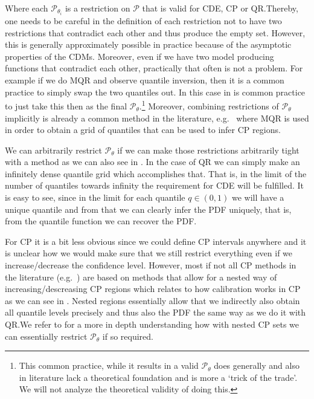 Where each $\mathscr{P}_{\theta_i}$ is a restriction on $\mathcal{P}$ that is valid for CDE, CP or QR.\@ Thereby, one needs to be careful in the definition of each restriction not to have two restrictions that contradict each other and thus produce the empty set. However, this is generally approximately possible in practice because of the asymptotic properties of the CDMs. Moreover, even if we have two model producing functions that contradict each other, practically that often is not a problem. For example if we do MQR and observe quantile inversion, then it is a common practice to simply swap the two quantiles out. In this case in is common practice to just take this then as the final $\mathcal{P}_{\theta}$.\footnote{This common practice, while it results in a valid $\mathcal{P}_{\theta}$ does generally and also in literature lack a theoretical foundation and is more a `trick of the trade'. We will not analyze the theoretical validity of doing this.} Moreover, combining restrictions of $\mathcal{P}_\theta$ implicitly is already a common method in the literature, e.g.~\cite{sesia2021conformal} where MQR is used in order to obtain a grid of quantiles that can be used to infer CP regions.

We can arbitrarily restrict $\mathcal{P}_\theta$ if we can make those restrictions arbitrarily tight with a method as we can also see in . In the case of QR we can simply make an infinitely dense quantile grid which accomplishes that. That is, in the limit of the number of quantiles towards infinity the requirement for CDE will be fulfilled. It is easy to see, since in the limit for each quantile $q\in(0,1)$ we will have a unique quantile and from that we can clearly infer the PDF uniquely, that is, from the quantile function we can recover the PDF.\@

For CP it is a bit less obvious since we could define CP intervals anywhere and it is unclear how we would make sure that we still restrict everything even if we increase/decrease the confidence level. However, most if not all CP methods in the literature (e.g.~\cite{sesia2021conformal, chernozhukov2021distributional}) are based on methods that allow for a nested way of increasing/descreasing CP regions which relates to how calibration works in CP as we can see in . Nested regions essentially allow that we indirectly also obtain all quantile levels precisely and thus also the PDF the same way as we do it with QR.\@ We refer to  for a more in depth understanding how with nested CP sets we can essentially restrict $\mathcal{P}_\theta$ if so required.


